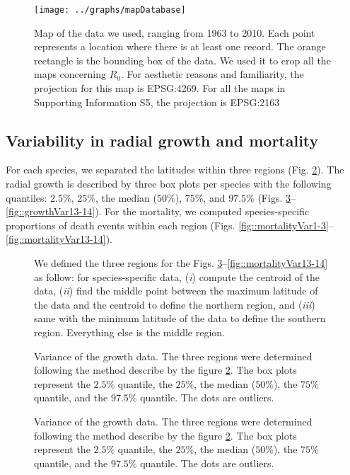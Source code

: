 \documentclass[letterpaper, 12pt]{article}
\theoremstyle{theo}
\begin{document}
\begin{refsection}
\begin{onehalfspace}
\begin{figure}[htb]
    \centering
	\texttt{[image: ../graphs/mapDatabase]}
	\caption{Map of the data we used, ranging from 1963 to 2010. Each point represents a location where there is at least one record. The orange rectangle is the bounding box of the data. We used it to crop all the maps concerning $ R_0 $. For aesthetic reasons and familiarity, the projection for this map is EPSG:4269. For all the maps in Supporting Information S5, the projection is EPSG:2163}
\label{fig::mapDatabase}
\end{figure}

\clearpage
\subsection{Variability in radial growth and mortality}
For each species, we separated the latitudes within three regions (Fig. \ref{fig::defineRegion}). The radial growth is described by three box plots per species with the following quantiles: $ 2.5 \% $, $ 25 \% $, the median ($ 50 \% $), $ 75 \% $, and $ 97.5 \% $ (Figs. \ref{fig::growthVar1-3}--\ref{fig::growthVar13-14}). For the mortality, we computed species-specific proportions of death events within each region (Figs. \ref{fig::mortalityVar1-3}--\ref{fig::mortalityVar13-14}).

\begin{figure}
	\centering
	
	\caption{We defined the three regions for the Figs. \ref{fig::growthVar1-3}--\ref{fig::mortalityVar13-14} as follow: for species-specific data, (\textit{i}) compute the centroid of the data, (\textit{ii}) find the middle point between the maximum latitude of the data and the centroid to define the northern region, and (\textit{iii}) same with the minimum latitude of the data to define the southern region. Everything else is the middle region. \label{fig::defineRegion}}
\end{figure}

\begin{figure}
	\centering
	
	\caption{Variance of the growth data. The three regions were determined following the method describe by the figure \ref{fig::defineRegion}. The box plots represent the $ 2.5 \%$ quantile, the $ 25 \% $, the median ($ 50 \% $), the $ 75 \% $ quantile, and the $ 97.5 \% $ quantile. The dots are outliers. \label{fig::growthVar1-3}}
\end{figure}

\begin{figure}
	\centering
	
	\caption{Variance of the growth data. The three regions were determined following the method describe by the figure \ref{fig::defineRegion}. The box plots represent the $ 2.5 \%$ quantile, the $ 25 \% $, the median ($ 50 \% $), the $ 75 \% $ quantile, and the $ 97.5 \% $ quantile. The dots are outliers. \label{fig::growthVar4-6}}
\end{figure}


\end{onehalfspace}
\end{refsection}
\end{document}
